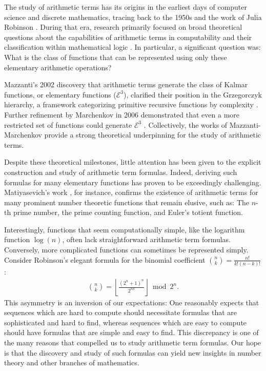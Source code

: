\documentclass{article}
\theoremstyle{plain}
\begin{document}
The study of arithmetic terms has its origins in the earliest days of computer science and discrete mathematics, tracing back to the 1950s and the work of Julia Robinson \cite{robinson1952arithmetic}. During that era, research primarily focused on broad theoretical questions about the capabilities of arithmetic terms in computability and their classification within mathematical logic \cite{herman1969elementary, grzegorczyk1953someclasses, robinson1952arithmetic}. In particular, a significant question was: What is the class of functions that can be represented using only these elementary arithmetic operations?

Mazzanti's 2002 discovery that arithmetic terms generate the class of Kalmar functions, or elementary functions ($\mathcal{E}^3$), clarified their position in the Grzegorczyk hierarchy, a framework categorizing primitive recursive functions by complexity \cite{mazzanti2002plainbases, grzegorczyk1953someclasses}. Further refinement by Marchenkov in 2006 demonstrated that even a more restricted set of functions could generate $\mathcal{E}^3$ \cite{marchenkov2007superposition}. Collectively, the works of Mazzanti-Marchenkov provide a strong theoretical underpinning for the study of arithmetic terms.

Despite these theoretical milestones, little attention has been given to the explicit construction and study of arithmetic term formulas. Indeed, deriving such formulas for many elementary functions has proven to be exceedingly challenging. Matiyasevich's work \cite{matiyasevich1980diophantine}, for instance, confirms the existence of arithmetic terms for many prominent number theoretic functions that remain elusive, such as: The $n$-th prime number, the prime counting function, and Euler's totient function.

Interestingly, functions that seem computationally simple, like the logarithm function $\log(n)$, often lack straightforward arithmetic term formulas. Conversely, more complicated functions can sometimes be represented simply. Consider Robinson's elegant formula for the binomial coefficient $\binom{n}{k} = \frac{n!}{k!(n-k)!}$ \cite{robinson1952arithmetic}:
\begin{align*}
\binom{n}{k} = \left\lfloor\frac{(2^n+1)^n}{2^{n k}}\right\rfloor \bmod{2^{n}} .
\end{align*}
This asymmetry is an inversion of our expectations: One reasonably expects that sequences which are hard to compute should necessitate formulas that are sophisticated and hard to find, whereas sequences which are easy to compute should have formulas that are simple and easy to find. This discrepancy is one of the many reasons that compelled us to study arithmetic term formulas. Our hope is that the discovery and study of such formulas can yield new insights in number theory and other branches of mathematics.
\end{document}
